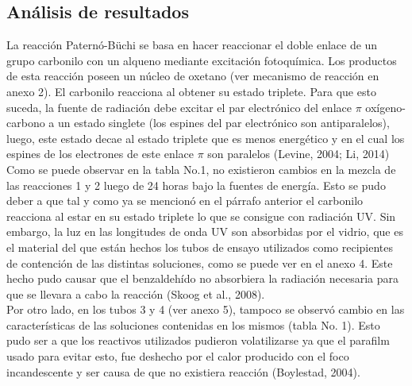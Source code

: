 \documentclass[12pt,letterpaper, onecolumn]{article}
\begin{document}
\begin{multicols}{2}

\section{Análisis de resultados}

La   reacción   Paternó-Büchi   se   basa   en hacer   reaccionar   el doble   enlace   de   un grupo  carbonilo  con  un  alqueno  mediante excitación  fotoquímica.  Los  productos  de esta   reacción   poseen un   núcleo   de oxetano   (ver  mecanismo  de  reacción  en anexo   2).   El   carbonilo   reacciona   al obtener  su  estado  triplete. Para  que  esto suceda,   la   fuente   de   radiación   debe excitar el   par   electrónico   del   enlace $\pi$ oxígeno-carbono  a  un  estado  singlete  (los espines   del   par   electrónico   son antiparalelos),  luego,  este  estado  decae  al estado  triplete  que es  menos  energético  y en  el  cual  los  espines  de  los  electrones  de este   enlace   $\pi$  son   paralelos   (Levine, 2004; Li, 2014)
\\

Como  se  puede  observar  en  la  tabla  No.1,  no  existieron cambios  en  la  mezcla  de las   reacciones  1  y  2  luego  de  24  horas bajo  la  fuentes  de  energía.  Esto  se  pudo deber  a  que tal  y  como  ya  se  mencionó  en el  párrafo  anterior  el carbonilo reacciona al   estar   en   su   estado   triplete  lo  que  se consigue  con  radiación  UV.  Sin  embargo, la  luz  en  las  longitudes  de  onda  UV  son absorbidas  por  el  vidrio,  que  es  el  material del  que  están  hechos  los  tubos  de  ensayo utilizados  como  recipientes  de  contención de   las   distintas   soluciones,   como   se puede  ver  en  el  anexo  4.  Este  hecho  pudo causar  que  el  benzaldehído  no  absorbiera la  radiación necesaria  para  que  se  llevara a   cabo   la   reacción   (Skoog   et  al., 2008).
\\

Por   otro   lado,   en   los   tubos   3   y   4   (ver anexo  5),  tampoco  se  observó  cambio  en las   características   de   las   soluciones contenidas   en  los  mismos  (tabla  No.  1). Esto   pudo ser   a   que   los   reactivos utilizados  pudieron  volatilizarse  ya  que  el parafilm   usado   para   evitar   esto,   fue            
deshecho   por   el   calor   producido   con  el  foco incandescente  y  ser  causa  de  que  no existiera   reacción   (Boylestad, 2004). 
\\


\end{multicols}
\end{document}
